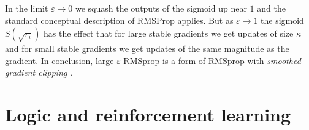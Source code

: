 \documentclass{article} %
\begin{document}
In the limit $\varepsilon \rightarrow 0$ we squash the outputs of the sigmoid up near $1$ and the standard conceptual description of RMSProp applies. But as $\varepsilon \rightarrow 1$ the sigmoid $S(\sqrt{r_i})$ has the effect that for large stable gradients we get updates of size $\kappa$ and for small stable gradients we get updates of the same magnitude as the gradient. In conclusion, large $\varepsilon$ RMSprop is a form of RMSprop with \emph{smoothed gradient clipping} \cite[\S 10.11.1]{dlbook}.



\section{Logic and reinforcement learning}
\label{appendix:logic_rl}
\end{document}
